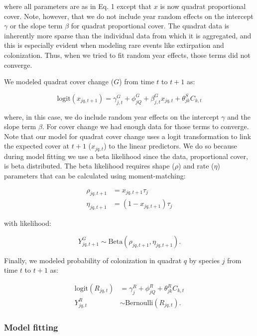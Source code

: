 \documentclass[12pt,]{article}
\begin{document}
where all parameters are as in Eq. 1 except that $x$ is now quadrat
proportional cover. Note, however, that we do not include year random
effects on the intercept $\gamma$ or the slope term $\beta$ for quadrat
proportional cover. The quadrat data is inherently more sparse than the
individual data from which it is aggregated, and this is especially
evident when modeling rare events like extirpation and colonization.
Thus, when we tried to fit random year effects, those terms did not
converge.

We modeled quadrat cover change ($G$) from time $t$ to $t+1$ as:

\begin{equation}
\text{logit}(x_{jq,t+1}) = \gamma^{G}_{j,t} + \phi^{G}_{jQ} + \beta^{G}_{j,t}x_{jq,t} + \theta^{S}_{jk}C_{k,t}
\end{equation}

where, in this case, we do include random year effects on the intercept
$\gamma$ and the slope term $\beta$. For cover change we had enough data
for those terms to converge. Note that our model for quadrat cover
change uses a logit transformation to link the expected cover at $t+1$
($x_{jq,t}$) to the linear predictors. We do so because during model
fitting we use a beta likelihood since the data, proportional cover, is
beta distributed. The beta likelihood requires shape ($\rho$) and rate
($\eta$) parameters that can be calculated using moment-matching:

\begin{align}
\rho_{jq,t+1} &= x_{jq,t+1}\tau_{j} \\
\eta_{jq,t+1} &= (1-x_{jq,t+1})\tau_{j}
\end{align}

with likelihood:

\begin{equation}
Y^{G}_{jq,t+1} \sim \text{Beta}(\rho_{jq,t+1}, \eta_{jq,t+1}).
\end{equation}

Finally, we modeled probability of colonization in quadrat $q$ by
species $j$ from time $t$ to $t+1$ as:

\begin{align}
\text{logit}(R_{jq,t}) &= \gamma^{R}_{j} + \phi^{R}_{jQ} + \theta^{R}_{jk}C_{k,t} \\
Y^{R}_{jq,t} &\sim \text{Bernoulli}(R_{jq,t}).
\end{align}

\subsubsection{Model fitting}\label{model-fitting}
\end{document}
